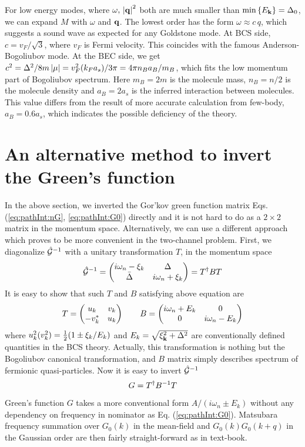 For low energy modes, where $\omega,\,\left\lvert{\ensuremath{\mathbf{q}}}\right\rvert^{2}$ both are much smaller than $\min\left\{E_{\mathbf{k}}\right\}=\Delta_{0}$, we can expand $M$ with $\omega$ and $\mathbf{q}$.  The lowest order has the form $\omega\approx{}c\,q$, which suggests a sound wave as expected for any Goldstone mode.  At BCS side, $c=v_{F}/\sqrt{3}$, where $v_{F}$ is Fermi velocity.  This coincides with the famous Anderson-Bogoliubov mode.  At the BEC side, we get $c^{2}=\Delta^{2}/8m\left\lvert{\mu}\right\rvert=v_{F}^{2}(k_{F}a_{s})/3\pi=4\pi{}n_{B}a_{B}/m_{B}$, which fits the low momentum part of Bogoliubov spectrum.  Here $m_{B}=2m$ is the molecule mass, $n_{B}=n/2$ is the molecule density and $a_{B}=2a_{s}$ is the inferred  interaction between molecules.  This value differs from the result of more accurate calculation from few-body, $a_{B}=0.6a_{s}$, which indicates the possible deficiency of the theory. 


\section{An alternative method to invert the Green's function\label{sec:diagonalizeGreen1}}
In the above section, we inverted the  Gor'kov green function matrix Eqs. (\ref{eq:pathInt:nG}, \ref{eq:pathInt:G0}) directly and it is not hard to do as a $2\times2$ matrix in the  momentum space.   Alternatively, we can use a different approach which proves to be more convenient in the two-channel problem.  First, we diagonalize $\hat{\mathcal{G}}^{-1}$ with a unitary transformation $T$, in the momentum space
\begin{equation}
\hat{\mathcal{G}}^{-1}=\begin{pmatrix}i\omega_{n}-\xi_{k}&\Delta\\\bar\Delta&i\omega_{n}+\xi_{k}\end{pmatrix}=T^{\dagger}BT
\end{equation}
It is easy to show that such $T$ and $B$ satisfying above equation are
\begin{equation}
T=\begin{pmatrix}u_{k}&v_{k}\\-v_{k}^{*}&u_{k}\end{pmatrix}\qquad{}B=\begin{pmatrix}i\omega_{n}+E_{k}&0\\0&i\omega_{n}-E_{k}\end{pmatrix}
\end{equation}
where $u_{k}^{2}(v_{k}^{2})=\frac{1}{2}(1\pm\xi_{k}/E_{k})$ and $E_{k}=\sqrt{\xi^{2}_{\mathbf{k}}+\Delta^{2}}$ are conventionally defined quantities in the BCS theory.   Actually, this transformation is nothing but the Bogoliubov canonical transformation, and $B$ matrix simply describes spectrum of fermionic quasi-particles.  Now it is easy to invert $\hat{\mathcal{G}}^{-1}$
\begin{equation}
G=T^{\dagger}B^{-1}T
\end{equation}
Green's function $G$ takes a more conventional form $A/(i\omega_{n}\pm{}E_{k})$ without any dependency on frequency in nominator as Eq. (\ref{eq:pathInt:G0}). Matsubara frequency summation over $G_{0}(k)$ in the mean-field and $G_{0}(k)G_{0}(k+q)$ in the Gaussian order are then fairly straight-forward as in text-book.  
